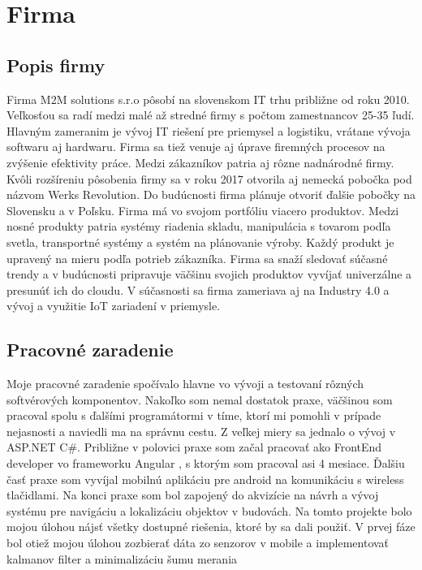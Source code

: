 \chapter{Firma} %

\section{Popis firmy}
Firma M2M solutions s.r.o \cite{firma} pôsobí na slovenskom  IT  trhu približne od roku 2010. Veľkosťou sa radí medzi malé až stredné  firmy s počtom zamestnancov 25-35 ľudí. Hlavným zameranim je vývoj IT riešení pre priemysel  a logistiku, vrátane vývoja  softwaru aj hardwaru. Firma sa tiež venuje aj úprave firemných procesov  na zvýšenie efektivity práce.  Medzi zákazníkov patria aj  rôzne nadnárodné firmy.  Kvôli rozšíreniu  pôsobenia  firmy  sa  v roku 2017 otvorila  aj nemecká pobočka pod názvom Werks Revolution. Do budúcnosti firma plánuje otvoriť ďalšie pobočky na Slovensku a v Poľsku.
Firma má  vo svojom portfóliu viacero produktov. Medzi nosné produkty patria  systémy riadenia skladu,  manipulácia s tovarom podľa svetla, transportné systémy a systém na  plánovanie výroby. Každý produkt je upravený na mieru podľa potrieb zákazníka. Firma sa snaží sledovať súčasné trendy a v budúcnosti  pripravuje väčšinu svojich produktov  vyvíjať univerzálne a presunúť ich do cloudu.  V súčasnosti sa firma zameriava aj na Industry 4.0 a vývoj a využitie IoT zariadení v priemysle. 

\section{Pracovné zaradenie}
Moje pracovné zaradenie  spočívalo hlavne vo vývoji a testovaní rôzných softvérových komponentov. Nakoľko som nemal  dostatok praxe, väčšinou som pracoval spolu s ďalšími programátormi v tíme, ktorí mi pomohli v prípade nejasnosti  a naviedli ma na správnu cestu. Z veľkej miery  sa jednalo o vývoj v ASP.NET C\#. Približne v polovici praxe som začal pracovať ako FrontEnd developer vo frameworku Angular , s ktorým som pracoval asi  4 mesiace. Ďalšiu časť praxe som vyvíjal mobilnú aplikáciu  pre android na komunikáciu s wireless tlačidlami.  Na konci praxe som bol zapojený do akvizície na návrh a vývoj systému pre navigáciu a lokalizáciu objektov v budovách.  Na tomto projekte bolo mojou úlohou nájsť všetky dostupné riešenia, ktoré by  sa dali použiť. V prvej fáze bol otiež mojou úlohou zozbierať dáta zo senzorov v mobile a implementovať kalmanov filter a minimalizáciu šumu merania